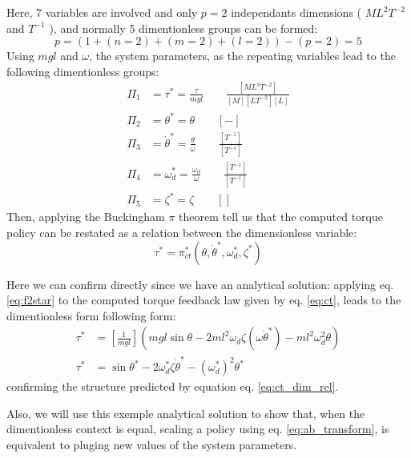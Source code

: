 Here, 7 variables are involved and only $p=2$ independants dimensions ( $ML^2T^{-2}$ and $T^{-1}$ ), and normally 5 dimentionless groups can be formed:
\begin{equation}
p = ( 1 + (n=2) + (m=2) + (l=2)) - ( p = 2 ) = 5
\end{equation}
Using $mgl$ and $\omega$, the system parameters, as the repeating variables lead to the following dimentionless groups:
\begin{align}
\Pi_1 &= \tau^* = \frac{\tau}{mgl} \quad \quad \frac{[ML^2T^{-2}]}{[M][LT^{-2}][L]} \\
\Pi_2 &= \theta^* = \theta \quad \quad [-]\\
\Pi_3 &= \dot{\theta}^* = \frac{ \dot{\theta}  }{ \omega } \quad \quad \frac{[T^{-1}]}{[T^{-1}]} \\
\Pi_4 &= \omega_d^* = \frac{\omega_d}{\omega} \quad \quad \frac{[T^{-1}]}{[T^{-1}]} \\
\Pi_5 &= \zeta^* = \zeta \quad \quad []
\end{align}
Then, applying the Buckingham $\pi$ theorem tell us that the computed torque policy can be restated as a relation between the dimensionless variable:
\begin{equation}
\tau^*
=
\pi^*_{ct} \left(
\theta, \dot{\theta}^*,
\omega_d^* , \zeta^* 
\right)
\label{eq:ct_dim_rel}
\end{equation}

Here we can confirm directly since we have an analytical solution: applying eq. \eqref{eq:f2star} to the computed torque feedback law given by eq. \eqref{eq:ct}, leads to the dimentionless form following form:
\begin{align}
\tau^* &= \left[ \frac{1}{mgl} \right] \left( mgl \sin \theta - 2 m l^2 \omega_d \zeta \left( \omega \dot{\theta}^*\right) - m l^2 \omega_d^2 \theta \right) \\
\tau^*
&=
\sin \theta^*
- 2 \omega_d^* \zeta \dot{\theta}^* 
- (\omega_d^*)^2 \theta^*
\end{align}
confirming the structure predicted by equation eq. \eqref{eq:ct_dim_rel}.

Also, we will use this exemple analytical solution to show that, when the dimentionless context is equal, scaling a policy using eq. \eqref{eq:ab_transform}, is equivalent to pluging new values of the system parameters. 

